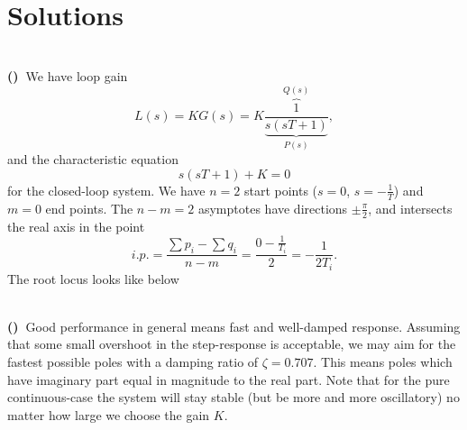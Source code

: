 \documentclass[letterpaper,12pt]{scrartcl}
\newenvironment{exercise}[1][Problem]{\begin{trivlist} \item[\hskip
    \labelsep {\stepcounter{exerctr}\bfseries #1
      \arabic{exerctr}}]}{\end{trivlist}\vspace{10mm}}
\newcounter{exerctr}
\newcounter{abcctr}[exerctr]
\newcommand{\abc}{\noindent\vspace{1mm}\\ {\bf
    \stepcounter{abcctr}(\alph{abcctr})\ }}
\begin{document}
\cleardoublepage

\section*{Solutions}
\setcounter{exerctr}{0} 

\begin{exercise}
\abc We have loop gain
\[ L(s) = KG(s) = K \frac{\overbrace{1}^{Q(s)}}{\underbrace{s(sT+1)}_{P(s)}}, \]
and the characteristic equation 
\[ s(sT+1) + K = 0\] for the closed-loop system. We have $n=2$ start points ($s=0$, $s=-\frac{1}{T}$) and $m=0$ end points. The $n-m=2$ asymptotes have directions $\pm \frac{\pi}{2}$, and intersects the real axis in the point \[i.p. = \frac{\sum p_i - \sum q_i}{n-m} = \frac{ 0 - \frac{1}{T_i}}{2} = - \frac{1}{2T_i}. \] The root locus looks like below
\begin{center}
\end{center}
\abc Good performance in general means fast and well-damped response. Assuming that some small overshoot in the step-response  is acceptable, we may aim for the fastest possible poles with a damping ratio of $\zeta=0.707$. This means poles which have imaginary part equal in magnitude to the real part. Note that for the pure continuous-case the system will stay stable (but be more and more oscillatory) no matter how large we choose the gain $K$.
\begin{center}
\end{center}
\end{exercise}
\end{document}
